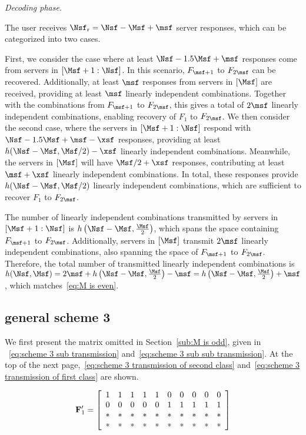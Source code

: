 \documentclass[conference,letterpaper]{IEEEtran}
\begin{document}
{\it Decoding phase.}

The user receives $\Nsf_{\rm r} = \Nsf - \Msf + \msf$ server responses, which can be categorized into two cases.

First, we consider the case where at least $\Nsf - 1.5\Msf + \msf$ responses come from servers in $[\Msf+1 : \Nsf]$. In this scenario, $F_{\msf+1}$ to $F_{2\msf}$ can be recovered. Additionally, at least $\msf$ responses from servers in $[\Msf]$ are received, providing at least $\msf$ linearly independent combinations. Together with the combinations from $F_{\msf+1}$ to $F_{2\msf}$, this gives a total of $2\msf$ linearly independent combinations, enabling recovery of $F_1$ to $F_{2\msf}$.
We then consider the second case, where the servers in $[\Msf+1: \Nsf]$ respond with $\Nsf - 1.5\Msf + \msf - \xsf$ responses, providing at least $h(\Nsf - \Msf, \Msf/2) - \xsf$ linearly independent combinations. Meanwhile, the servers in $[\Msf]$ will have $\Msf/2 + \xsf$ responses, contributing at least $\msf +\xsf$ linearly independent combinations. In total, these responses provide $h(\Nsf - \Msf, \Msf/2)$ linearly independent combinations, which are sufficient to recover $F_1$ to $F_{2\msf}$.

The number of linearly independent combinations transmitted by servers in $[\Msf+1:\Nsf]$ is $h\left(\Nsf-\Msf, \frac{\Msf}{2}\right)$, which spans the space containing $F_{\msf+1}$ to $F_{2\msf}$. Additionally, servers in $[\Msf]$ transmit $2\msf$ linearly independent combinations, also spanning the space of $F_{\msf+1}$ to $F_{2\msf}$. Therefore, the total number of transmitted linearly independent combinations is $h(\Nsf,\Msf)= 2\msf + h\left(\Nsf-\Msf, \frac{\Msf}{2}\right) - \msf = h\left(\Nsf-\Msf, \frac{\Msf}{2}\right) + \msf$, which matches~\eqref{eq:M is even}.
\\

\subsection{general scheme 3}
\label{general scheme 3}
\iffalse
We first present the matrix omitted in Section~\ref{sub:M is odd}, given in 
~\ref{eq:scheme 3 sub transmission} and~\ref{eq:scheme 3 sub sub transmission}. 
At the top of the next page,~\ref{eq:scheme 3 transmission of second class} 
and~\ref{eq:scheme 3 transmission of first class} are shown.



\begin{equation} \label{eq:scheme 3 sub transmission}
{\bf F}^{\prime}_1= \left[
\begin{array}{cccccccccc}
  1 & 1 & 1 & 1 & 1 & 0 & 0 & 0 & 0 & 0  \\
  0 & 0 & 0 & 0 & 0 & 1 & 1 & 1 & 1 & 1 \\
  * & * & * & * & * & * & * & * & * & * \\
  * & * & * & * & * & * & * & * & * & *
\end{array}
 \right]
\end{equation}
\end{document}
